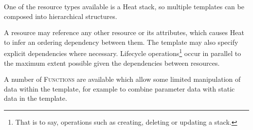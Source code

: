 One of the resource types available is a Heat stack, so multiple templates can be composed into hierarchical structures.

A resource may reference any other resource or its attributes, which causes Heat to infer an ordering dependency between them. The template may also specify explicit dependencies where necessary. Lifecycle operations\footnote{That is to say, operations such as creating, deleting or updating a stack.} occur in parallel to the maximum extent possible given the dependencies between resources.

A number of \textsc{Functions} are available which allow some limited manipulation of data within the template, for example to combine parameter data with static data in the template.
